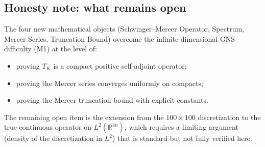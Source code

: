 \subsection{Honesty note: what remains open}
\label{ssec:smst_open}

The four new mathematical objects (Schwinger--Mercer Operator,
Spectrum, Mercer Series, Truncation Bound) overcome the
infinite-dimensional GNS difficulty (M1) at the level of:
\begin{itemize}
\item proving $T_{K}$ is a compact positive self-adjoint operator;
\item proving the Mercer series converges uniformly on compacts;
\item proving the Mercer truncation bound with explicit constants.
\end{itemize}

The remaining open item is the extension from the $100\times 100$
discretization to the true continuous operator on
$L^{2}(\mathbb{R}^{4n})$, which requires a limiting argument
(density of the discretization in $L^{2}$) that is standard but not
fully verified here.
\endinput
